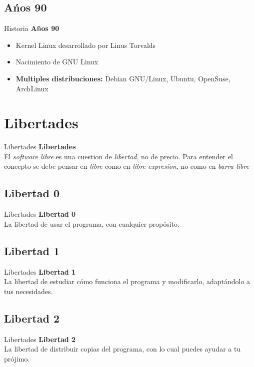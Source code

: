 \documentclass{beamer}
\begin{document}
\subsection{A\'nos 90}
\begin{frame}{Historia}
	  \centering
	   \alert  {\bf A\~nos 90} 
	   \begin{itemize}
	      \item Kernel Linux desarrollado por Linus Torvalds
	      \item Nacimiento de GNU Linux
              \item {\bf Multiples distribuciones:}  Debian GNU/Linux, Ubuntu, OpenSuse, ArchLinux
	   \end {itemize}
\end{frame}

\section{Libertades}
\begin{frame}{Libertades}
\centering
       \alert {\bf Libertades }\\
      El {\em software libre} es una cuestion de {\em libertad}, no de precio. 
      Para entender el concepto se debe pensar en {\em libre} como en {\em libre expresion}, no como en {\em barra libre}
\end{frame}

\subsection{Libertad 0}
\begin{frame}{Libertades}
      \centering
       \alert {\bf Libertad 0} \\
	La libertad de usar el programa, con cualquier prop\'osito.
  
\end{frame}
\subsection{Libertad 1}
\begin{frame}{Libertades}
      \centering
       \alert {\bf Libertad 1} \\
	La libertad de estudiar c\'omo funciona el programa y modificarlo, adapt\'andolo a tus necesidades.
\end{frame}

\subsection{Libertad 2}
\begin{frame}{Libertades}
      \centering
      \alert {\bf Libertad 2} \\
      La libertad de distribuir copias del programa, con lo cual puedes ayudar a tu pr\'ojimo.
\end{frame}
\end{document}
